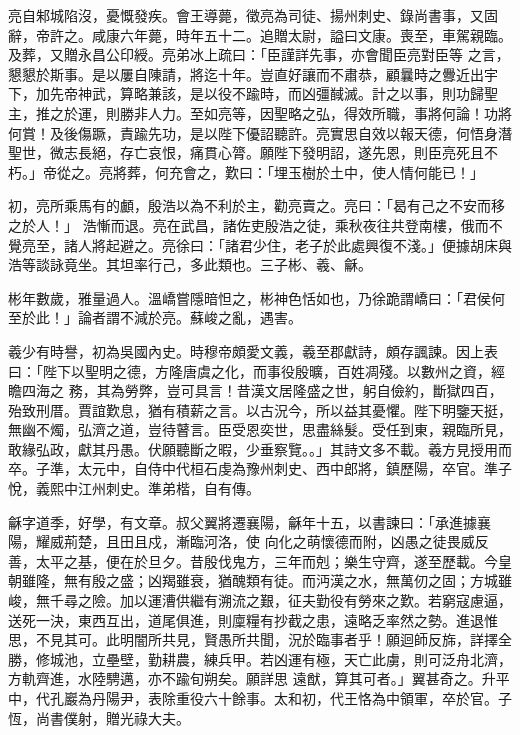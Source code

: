 \begin{pinyinscope}
 亮自邾城陷沒，憂慨發疾。會王導薨，徵亮為司徒、揚州刺史、錄尚書事，又固辭，帝許之。咸康六年薨，時年五十二。追贈太尉，謚曰文康。喪至，車駕親臨。及葬，又贈永昌公印綬。亮弟冰上疏曰：「臣謹詳先事，亦會聞臣亮對臣等
 之言，懇懇於斯事。是以屢自陳請，將迄十年。豈直好讓而不肅恭，顧曩時之釁近出宇下，加先帝神武，算略兼該，是以役不踰時，而凶彊馘滅。計之以事，則功歸聖主，推之於運，則勝非人力。至如亮等，因聖略之弘，得效所職，事將何論！功將何賞！及後傷蹶，責踰先功，是以陛下優詔聽許。亮實思自效以報天德，何悟身潛聖世，微志長絕，存亡哀恨，痛貫心膂。願陛下發明詔，遂先恩，則臣亮死且不朽。」帝從之。亮將葬，何充會之，歎曰：「埋玉樹於土中，使人情何能已！」



 初，亮所乘馬有的顱，殷浩以為不利於主，勸亮賣之。亮曰：「曷有己之不安而移之於人！」
 浩慚而退。亮在武昌，諸佐吏殷浩之徒，乘秋夜往共登南樓，俄而不覺亮至，諸人將起避之。亮徐曰：「諸君少住，老子於此處興復不淺。」便據胡床與浩等談詠竟坐。其坦率行己，多此類也。三子彬、羲、龢。



 彬年數歲，雅量過人。溫嶠嘗隱暗怛之，彬神色恬如也，乃徐跪謂嶠曰：「君侯何至於此！」論者謂不減於亮。蘇峻之亂，遇害。



 羲少有時譽，初為吳國內史。時穆帝頗愛文義，羲至郡獻詩，頗存諷諫。因上表曰：「陛下以聖明之德，方隆唐虞之化，而事役殷曠，百姓凋殘。以數州之資，經瞻四海之
 務，其為勞弊，豈可具言！昔漢文居隆盛之世，躬自儉約，斷獄四百，殆致刑厝。賈誼歎息，猶有積薪之言。以古況今，所以益其憂懼。陛下明鑒天挺，無幽不燭，弘濟之道，豈待瞽言。臣受恩奕世，思盡絲髮。受任到東，親臨所見，敢緣弘政，獻其丹愚。伏願聽斷之暇，少垂察覽。。」其詩文多不載。羲方見授用而卒。子準，太元中，自侍中代桓石虔為豫州刺史、西中郎將，鎮歷陽，卒官。準子悅，義熙中江州刺史。準弟楷，自有傳。



 龢字道季，好學，有文章。叔父翼將遷襄陽，龢年十五，以書諫曰：「承進據襄陽，耀威荊楚，且田且戍，漸臨河洛，使
 向化之萌懷德而附，凶愚之徒畏威反善，太平之基，便在於旦夕。昔殷伐鬼方，三年而剋；樂生守齊，遂至歷載。今皇朝雖隆，無有殷之盛；凶羯雖衰，猶醜類有徒。而沔漢之水，無萬仞之固；方城雖峻，無千尋之險。加以運漕供繼有溯流之艱，征夫勤役有勞來之歎。若窮寇慮逼，送死一決，東西互出，道尾俱進，則廩糧有抄截之患，遠略乏率然之勢。進退惟思，不見其可。此明闇所共見，賢愚所共聞，況於臨事者乎！願迴師反旆，詳擇全勝，修城池，立壘壁，勤耕農，練兵甲。若凶運有極，天亡此虜，則可泛舟北濟，方軌齊進，水陸騁邁，亦不踰旬朔矣。願詳思
 遠猷，算其可者。」翼甚奇之。升平中，代孔巖為丹陽尹，表除重役六十餘事。太和初，代王恪為中領軍，卒於官。子恆，尚書僕射，贈光祿大夫。




\end{pinyinscope}
